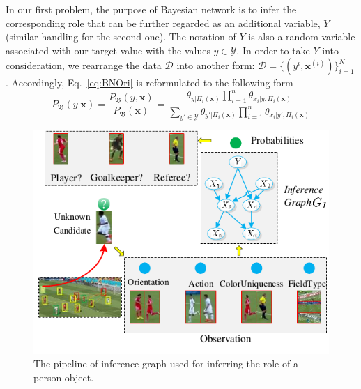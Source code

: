 In our first problem, the purpose of Bayesian network is to infer the corresponding role that can be further regarded as an additional variable, \eg $Y$ (similar handling for the second one). 
The notation of $Y$ is also a random variable associated with our target value with the values $y\in\mathcal{Y}$. 
In order to take $Y$ into consideration, we rearrange the data $\mathcal{D}$ into another form: $\mathcal{D}=\{(y^{i}, \mathbf{x}^{(i)})\}_{i=1}^N$. Accordingly, Eq.~\eqref{eq:BNOri} is reformulated to the following form 
\vspace{-1ex}
\begin{equation}\label{eq:BNWithCls}
P_\mathfrak{B}(y|\mathbf{x}) = \frac{P_\mathfrak{B}(y,\mathbf{x})}{P_\mathfrak{B}(\mathbf{x})}
=\frac{ \theta_{y|\Pi_i(\mathbf{x})} \prod_{i=1}^{n} \theta_{x_i|y, \Pi_i(\mathbf{x})} }{ \sum_{y'\in \mathcal{Y}} \theta_{y'|\Pi_i(\mathbf{x})} \prod_{i=1}^{n} \theta_{x_i|y', \Pi_i(\mathbf{x})} }
\end{equation}
\vspace{-1ex}

\begin{figure}[tb]
\centering
\includegraphics[width=\columnwidth]{./figure/inferGraphWorkflow}
\caption{The pipeline of inference graph used for inferring the role of a person object.}
\vspace{-4ex}
\label{fig:inferGraphWorkflow}
\end{figure}


